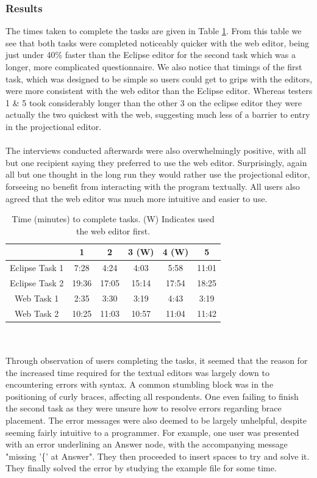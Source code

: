 \documentclass{article}
\begin{document}
\subsubsection{Results}
The times taken to complete the tasks are given in Table \ref{Tab:questionnaireResults}. From this table we see that both tasks were completed noticeably quicker with the web editor, being just under 40\% faster than the Eclipse editor for the second task which was a longer, more complicated questionnaire. We also notice that timings of the first task, which was designed to be simple so users could get to grips with the editors, were more consistent with the web editor than the Eclipse editor. Whereas testers 1 \& 5 took considerably longer than the other 3 on the eclipse editor they were actually the two quickest with the web, suggesting much less of a barrier to entry in the projectional editor.  
\\
\\
The interviews conducted afterwards were also overwhelmingly positive, with all but one recipient saying they preferred to use the web editor. Surprisingly, again all but one thought in the long run they would rather use the projectional editor, forseeing no benefit from interacting with the program textually. All users also agreed that the web editor was much more intuitive and easier to use.
\begin{table}[ht]
\centering
	\begin{tabular}{| c | c | c | c | c | c |}
	\hline
	& 1  & 2 & 3 (W) & 4 (W) & 5 \\
	\hline 
	Eclipse Task 1 & 7:28 & 4:24 & 4:03 & 5:58 & 11:01 \\
	Eclipse Task 2 & 19:36 & 17:05 & 15:14 & 17:54 & 18:25 \\
	Web Task 1 & 2:35 & 3:30 & 3:19 & 4:43 & 3:19 \\
	Web Task 2 & 10:25 & 11:03 & 10:57 & 11:04 & 11:42 \\
	\hline
	\end{tabular}
	\caption{Time (minutes) to complete tasks. (W) Indicates used the web editor first.}
	\label{Tab:questionnaireResults}
\end{table}
\\
\\
Through observation of users completing the tasks, it seemed that the reason for the increased time required for the textual editors was largely down to encountering errors with syntax. A common stumbling block was in the positioning of curly braces, affecting all respondents. One even failing to finish the second task as they were unsure how to resolve errors regarding brace placement. The error messages were also deemed to be largely unhelpful, despite seeming fairly intuitive to a programmer. For example, one user was presented with an error underlining an Answer node, with the accompanying message "missing '\{' at Answer". They then proceeded to insert spaces to try and solve it. They finally solved the error by studying the example file for some time. 
\end{document}
